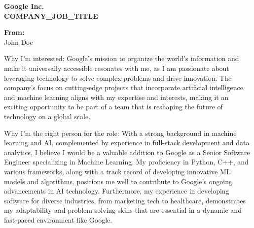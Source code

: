\documentclass{article}
\begin{document}
\begin{center}
    \large
    \textbf{Google Inc.} \\
    \vspace{1em}
    \textbf{{{COMPANY_JOB_TITLE}}} \\
\end{center}

\vspace{2em}

\noindent
\textbf{From:} \\
{{{John Doe}}} \\
\vspace{1em}

\noindent 
Why I'm interested:
{Google's mission to organize the world's information and make it universally accessible resonates with me, as I am passionate about leveraging technology to solve complex  problems and drive innovation. The company's focus on cutting-edge projects that  incorporate artificial intelligence and machine learning aligns with my expertise  and interests, making it an exciting opportunity to be part of a team that is  reshaping the future of technology on a global scale.
}

Why I'm the right person for the role:
{With a strong background in machine learning and AI, complemented by experience in  full-stack development and data analytics, I believe I would be a valuable addition  to Google as a Senior Software Engineer specializing in Machine Learning. My proficiency  in Python, C++, and various frameworks, along with a track record of developing  innovative ML models and algorithms, positions me well to contribute to Google's  ongoing advancements in AI technology. Furthermore, my experience in developing  software for diverse industries, from marketing tech to healthcare, demonstrates my  adaptability and problem-solving skills that are essential in a dynamic and  fast-paced environment like Google.
}
\end{document}
